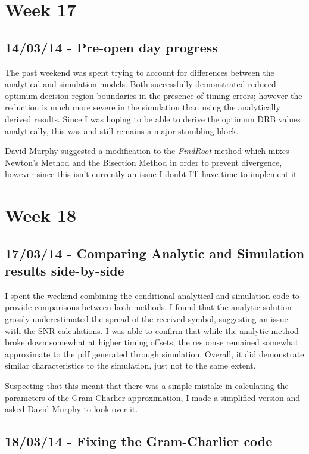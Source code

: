 \section{Week 17}

\subsection{14/03/14 - Pre-open day progress}

The past weekend was spent trying to account for differences between the
analytical and simulation models. Both successfully demonstrated reduced
optimum decision region boundaries in the presence of timing errors;
however the reduction is much more severe in the simulation than using
the analytically derived results. Since I was hoping to be able to
derive the optimum DRB values analytically, this was and still remains a
major stumbling block.

David Murphy suggested a modification to the \emph{FindRoot} method which mixes
Newton's Method and the Bisection Method in order to prevent divergence,
however since this isn't currently an issue I doubt I'll have time to
implement it.

\section{Week 18}

\subsection{17/03/14 - Comparing Analytic and Simulation results
side-by-side}

I spent the weekend combining the conditional analytical and simulation
code to provide comparisons between both methods. I found that the
analytic solution grossly underestimated the spread of the received
symbol, suggesting an issue with the SNR calculations. I was able to
confirm that while the analytic method broke down somewhat at higher
timing offsets, the response remained somewhat approximate to the pdf
generated through simulation. Overall, it did demonstrate similar
characteristics to the simulation, just not to the same extent.

Suspecting that this meant that there was a simple mistake in
calculating the parameters of the Gram-Charlier approximation, I made a
simplified version and asked David Murphy to look over it.

\subsection{18/03/14 - Fixing the Gram-Charlier code}

